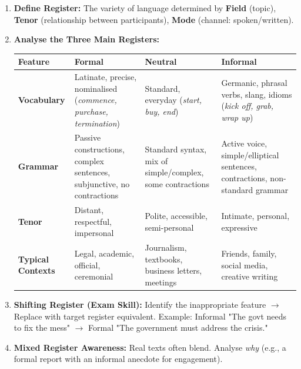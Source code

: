 \documentclass[11pt]{article}
\newcommand{\cle}[1]{{\popxbold\color{popdark}#1}}
\begin{document}
\begin{methode}
\begin{enumerate}
    \item \textbf{Define \cle{Register}:} The variety of language determined by \textbf{Field} (topic), \textbf{Tenor} (relationship between participants), \textbf{Mode} (channel: spoken/written).
    \item \textbf{Analyse the \cle{Three Main Registers}:}
    \begin{center}
    \begin{tabularx}{\linewidth}{|l|X|X|X|}
    \hline
    \rowcolor{popblueL} \textbf{Feature} & \textbf{Formal} & \textbf{Neutral} & \textbf{Informal} \\
    \hline
    \textbf{Vocabulary} & Latinate, precise, nominalised (\textit{commence, purchase, termination}) & Standard, everyday (\textit{start, buy, end}) & Germanic, phrasal verbs, slang, idioms (\textit{kick off, grab, wrap up}) \\
    \hline
    \textbf{Grammar} & Passive constructions, complex sentences, subjunctive, no contractions & Standard syntax, mix of simple/complex, some contractions & Active voice, simple/elliptical sentences, contractions, non-standard grammar \\
    \hline
    \textbf{Tenor} & Distant, respectful, impersonal & Polite, accessible, semi-personal & Intimate, personal, expressive \\
    \hline
    \textbf{Typical Contexts} & Legal, academic, official, ceremonial & Journalism, textbooks, business letters, meetings & Friends, family, social media, creative writing \\
    \hline
    \end{tabularx}
    \end{center}
    \item \textbf{Shifting Register (Exam Skill):} Identify the \cle{inappropriate} feature $\rightarrow$ Replace with \cle{target register} equivalent. Example: Informal "The govt needs to fix the mess" $\rightarrow$ Formal "The government must address the crisis."
    \item \textbf{Mixed Register Awareness:} Real texts often blend. Analyse \emph{why} (e.g., a formal report with an informal anecdote for engagement).
\end{enumerate}
\end{methode}
\end{document}
